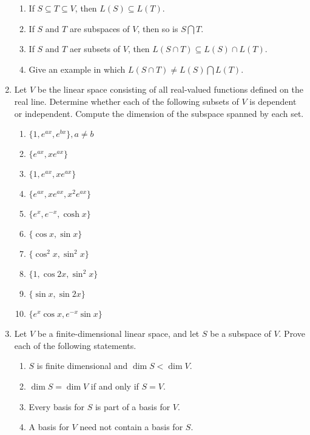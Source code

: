 \documentclass[main.tex]{subfiles}
\begin{document}
\begin{enumerate}
\begin{enumerate}
            \item If $S \subseteq T \subseteq V$, then $L(S) \subseteq L(T)$.
            \item If $S$ and $T$ are subspaces of $V$, then so is $S \bigcap T$.
            \item If $S$ and $T$ aer subsets of $V$, then $L(S \cap T) \subseteq L(S) \cap L(T)$.
            \item Give an example in which $L(S \cap T) \neq L(S) \bigcap L(T)$.
        \end{enumerate}
        \item Let $V$ be the linear space consisting of all real-valued functions defined on the real line. Determine whether each of the following subsets of $V$ is dependent or independent. Compute the dimension of the subspace spanned by each set.
        \begin{enumerate}
            \item $\{1, e^{ax}, e^{bx}\}, a \neq b$
            \item $\{e^{ax}, xe^{ax}\}$
            \item $\{1, e^{ax}, xe^{ax}\}$
            \item $\{e^{ax}, xe^{ax}, x^2e^{ax}\}$
            \item $\{e^x, e^{-x}, \cosh x\}$
            \item $\{\cos x, \sin x\}$
            \item $\{\cos^2 x, \sin^2 x\}$
            \item $\{1, \cos 2x, \sin^2 x\}$
            \item $\{\sin x, \sin 2x\}$
            \item $\{e^x\cos x, e^{-x}\sin x\}$
        \end{enumerate}
        \item Let $V$ be a finite-dimensional linear space, and let $S$ be a subspace of $V$. Prove each of the following statements.
        \begin{enumerate}
            \item $S$ is finite dimensional and $\dim S < \dim V$.
            \item $\dim S = \dim V$ if and only if $S = V$.
            \item Every basis for $S$ is part of a basis for $V$.
            \item A basis for $V$ need not contain a basis for $S$.
        \end{enumerate}
    \end{enumerate}
\end{document}

